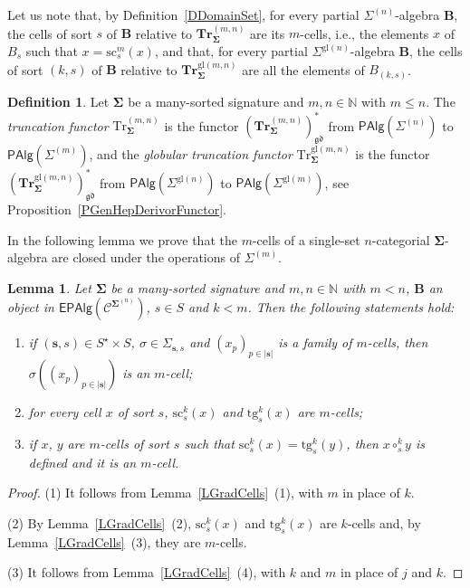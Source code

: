 \documentclass[a4paper, reqno
]{amsart}
\newcommand{\bb}[1]{\ensuremath{\lvert #1 \rvert}}
\newcommand{\sig}[1]{\mathbf{#1}}             %
\newcommand{\spec}[1]{\boldsymbol{\mathcal{#1}}} %
\newcommand{\gd}{\mathfrak{gd}}              %
\newcommand{\gl}{\mathrm{gl}}                %
\newcommand{\src}{\mathrm{sc}}
\newcommand{\tgt}{\mathrm{tg}}
\newcommand{\Tr}{\mathrm{Tr}}
\newcommand{\bTr}{\mathbf{Tr}}
\theoremstyle{plain}
\newtheorem{lemma}[theorem]{Lemma}
\theoremstyle{definition}
\newtheorem{definition}[theorem]{Definition}
\begin{document}
Let us note that, by Definition~\ref{DDomainSet}, for every partial $\Sigma^{(n)}$-algebra $\mathbf{B}$, the cells of sort $s$ of $\mathbf{B}$ relative to $\bTr^{(m,n)}_{\sig{\Sigma}}$ are its $m$-cells, i.e., the elements $x$ of $B_{s}$ such that $x=\src^{m}_{s}(x)$, and that, for every partial $\Sigma^{\gl(n)}$-algebra $\mathbf{B}$, the cells of sort $(k,s)$ of $\mathbf{B}$ relative to $\bTr^{\gl(m,n)}_{\sig{\Sigma}}$ are all the elements of $B_{(k,s)}$.

\begin{definition}\label{DTruncation}
Let $\sig{\Sigma}$ be a many-sorted signature and $m,n\in\mathbb{N}$ with $m\leq n$.
The \emph{truncation functor} $\Tr^{(m,n)}_{\sig{\Sigma}}$ is the functor $(\bTr^{(m,n)}_{\sig{\Sigma}})^{\ast}_{\gd}$ from $\mathsf{PAlg}(\Sigma^{(n)})$ to $\mathsf{PAlg}(\Sigma^{(m)})$, and the \emph{globular truncation functor} $\Tr^{\gl(m,n)}_{\sig{\Sigma}}$ is the functor $(\bTr^{\gl(m,n)}_{\sig{\Sigma}})^{\ast}_{\gd}$ from $\mathsf{PAlg}(\Sigma^{\gl(n)})$ to $\mathsf{PAlg}(\Sigma^{\gl(m)})$, see Proposition~\ref{PGenHepDerivorFunctor}.
\end{definition}

In the following lemma we prove that the $m$-cells of a single-set $n$-categorial $\sig{\Sigma}$-algebra are closed under the operations of $\Sigma^{(m)}$.

\begin{lemma}\label{LTruncCells}
Let $\sig{\Sigma}$ be a many-sorted signature and $m,n\in\mathbb{N}$ with $m<n$, $\mathbf{B}$ an object in $\mathsf{EPAlg}(\spec{C}^{\sig{\Sigma}^{(n)}})$, $s\in S$ and $k<m$.
Then the following statements hold:
\begin{enumerate}
\item if $(\mathbf{s},s)\in S^{\star}\times S$, $\sigma\in\Sigma_{\mathbf{s},s}$ and $(x_{p})_{p\in\bb{\mathbf{s}}}$ is a family of $m$-cells, then $\sigma((x_{p})_{p\in\bb{\mathbf{s}}})$ is an $m$-cell;
\item for every cell $x$ of sort $s$, $\src^{k}_{s}(x)$ and $\tgt^{k}_{s}(x)$ are $m$-cells;
\item if $x$, $y$ are $m$-cells of sort $s$ such that $\src^{k}_{s}(x)=\tgt^{k}_{s}(y)$, then $x\circ^{k}_{s}y$ is defined and it is an $m$-cell.
\end{enumerate}
\end{lemma}
\begin{proof}
(1) It follows from Lemma~\ref{LGradCells}~(1), with $m$ in place of $k$.

(2) By Lemma~\ref{LGradCells}~(2), $\src^{k}_{s}(x)$ and $\tgt^{k}_{s}(x)$ are $k$-cells and, by Lemma~\ref{LGradCells}~(3), they are $m$-cells.

(3) It follows from Lemma~\ref{LGradCells}~(4), with $k$ and $m$ in place of $j$ and $k$.
\end{proof}
\end{document}
